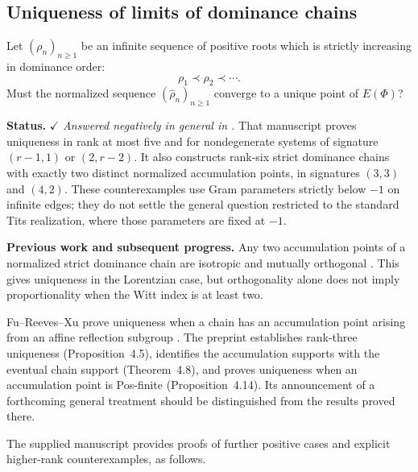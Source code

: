 \documentclass[11pt,reqno]{amsart}
\theoremstyle{plain}
\theoremstyle{definition}
\theoremstyle{remark}
\numberwithin{equation}{section}
\begin{document}
\subsection{Uniqueness of limits of dominance chains}

Let $(\rho_n)_{n\ge1}$ be an infinite sequence of positive roots
which is strictly increasing in dominance order:
\[
\rho_1\prec\rho_2\prec\cdots.
\]
Must the normalized sequence $(\widehat{\rho}_n)_{n\ge1}$
converge to a unique point of $E(\Phi)$?

\par\medskip
\noindent\textbf{Status.}
\(\checkmark\) \textit{Answered negatively in general in
\cite{WangUniqueness}.}
That manuscript proves uniqueness in rank at most five and
for nondegenerate systems of signature $(r-1,1)$ or $(2,r-2)$.
It also constructs rank-six strict dominance chains with exactly
two distinct normalized accumulation points, in signatures
$(3,3)$ and $(4,2)$.
These counterexamples use Gram parameters strictly below $-1$
on infinite edges; they do not settle the general question
restricted to the standard Tits realization, where those
parameters are fixed at $-1$.

\par\medskip
\noindent\textbf{Previous work and subsequent progress.}
Any two accumulation points of a normalized strict dominance
chain are isotropic and mutually orthogonal
\cite[Proposition~6.8(b)]{DHR}.
This gives uniqueness in the Lorentzian case, but orthogonality
alone does not imply proportionality when the Witt index
is at least two.

Fu--Reeves--Xu prove uniqueness when a chain has an accumulation
point arising from an affine reflection subgroup
\cite[Proposition~6.5]{FRX2026}.
The preprint \cite{FuEtAl2026} establishes rank-three uniqueness
(Proposition~4.5), identifies the accumulation supports with
the eventual chain support (Theorem~4.8), and proves uniqueness
when an accumulation point is Pos-finite (Proposition~4.14).
Its announcement of a forthcoming general treatment should
be distinguished from the results proved there.

The supplied manuscript \cite{WangUniqueness} provides proofs
of further positive cases and explicit higher-rank
counterexamples, as follows.
\end{document}
